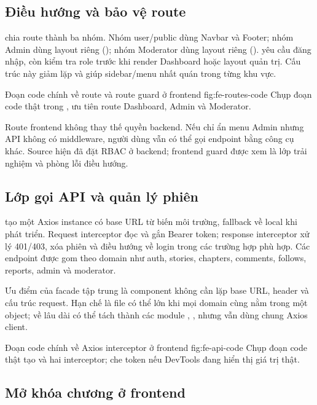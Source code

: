\subsection{Điều hướng và bảo vệ route}

 chia route thành ba nhóm. Nhóm user/public dùng Navbar và Footer; nhóm Admin dùng layout riêng (); nhóm Moderator dùng layout riêng ().  yêu cầu đăng nhập, còn  kiểm tra role trước khi render Dashboard hoặc layout quản trị. Cấu trúc này giảm lặp và giúp sidebar/menu nhất quán trong từng khu vực.

  {Đoạn code chính về route và route guard ở frontend}
  {fig:fe-routes-code}
  {Chụp đoạn code thật trong , ưu tiên route Dashboard, Admin và Moderator.}

Route frontend không thay thế quyền backend. Nếu chỉ ẩn menu Admin nhưng API không có middleware, người dùng vẫn có thể gọi endpoint bằng công cụ khác. Source hiện đã đặt RBAC ở backend; frontend guard được xem là lớp trải nghiệm và phòng lỗi điều hướng.
\clearpage
\subsection{Lớp gọi API và quản lý phiên}

 tạo một Axios instance có base URL từ biến môi trường, fallback về local khi phát triển. Request interceptor đọc  và gắn Bearer token; response interceptor xử lý 401/\allowbreak{}403, xóa phiên và điều hướng về login trong các trường hợp phù hợp. Các endpoint được gom theo domain như auth, stories, chapters, comments, follows, reports, admin và moderator.

Ưu điểm của facade tập trung là component không cần lặp base URL, header và cấu trúc request. Hạn chế là file có thể lớn khi mọi domain cùng nằm trong một object; về lâu dài có thể tách thành các module , ,  nhưng vẫn dùng chung Axios client.

  {Đoạn code chính về Axios interceptor ở frontend}
  {fig:fe-api-code}
  {Chụp đoạn code thật tạo  và hai interceptor; che token nếu DevTools đang hiển thị giá trị thật.}
\subsection{Mở khóa chương ở frontend}

